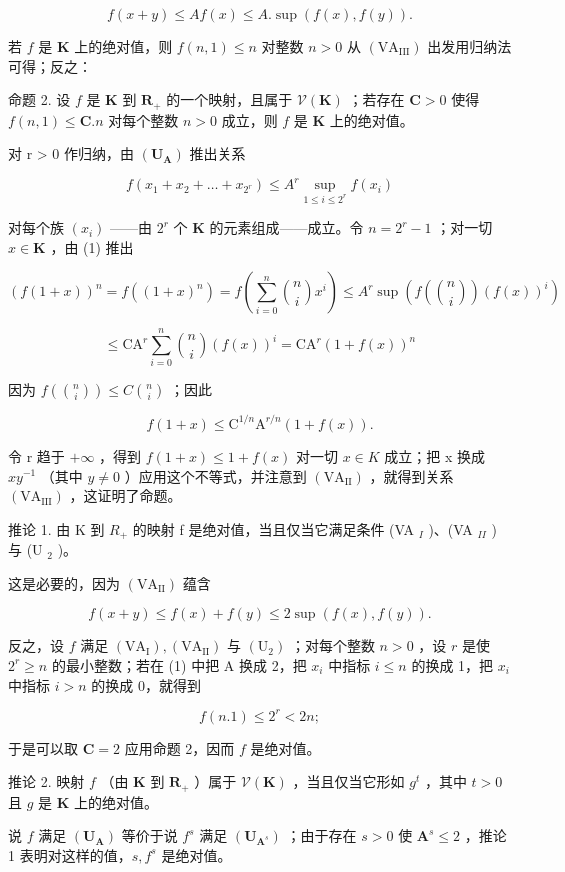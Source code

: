 \[
f (x + y) \leqslant A f (x) \leqslant A. \sup (f (x), f (y)).
\]

若 \(f\) 是 \(\mathbf{K}\) 上的绝对值，则 \(f(n,1) \leqslant n\) 对整数 \(n > 0\) 从 \((\mathrm{VA}_{\mathrm{III}})\) 出发用归纳法可得；反之：

命题 2. 设 \(f\) 是 \(\mathbf{K}\) 到 \(\mathbf{R}_+\) 的一个映射，且属于 \(\mathcal{V}(\mathbf{K})\) ；若存在 \(\mathbf{C} > 0\) 使得 \(f(n,1) \leqslant \mathbf{C}.n\) 对每个整数 \(n > 0\) 成立，则 \(f\) 是 \(\mathbf{K}\) 上的绝对值。

对 r > 0 作归纳，由 \((\mathbf{U}_{\mathbf{A}})\) 推出关系

\[
f (x _ {1} + x _ {2} + \dots + x _ {2 ^ {r}}) \leqslant A ^ {r} \sup _ {1 \leqslant i \leqslant 2 ^ {r}} f (x _ {i})\tag{1}
\]

对每个族 \((x_{i})\) ——由 \(2^{r}\) 个 \(\mathbf{K}\) 的元素组成——成立。令 \(n = 2^{r} - 1\) ；对一切 \(x \in \mathbf{K}\) ，由 (1) 推出

\[
(f (1 + x)) ^ {n} = f ((1 + x) ^ {n}) = f \left(\sum_ {i = 0} ^ {n} \binom {n} {i} x ^ {i}\right) \leqslant A ^ {r} \sup \left(f \left(\binom {n} {i}\right) (f (x)) ^ {i}\right)
\]

\[
\leqslant \mathrm{CA} ^ {r} \sum_ {i = 0} ^ {n} \binom {n} {i} (f (x)) ^ {i} = \mathrm{CA} ^ {r} (1 + f (x)) ^ {n}
\]

因为 \(f\left(\binom{n}{i}\right) \leqslant C\binom{n}{i}\) ；因此

\[
f (1 + x) \leqslant \mathrm{C} ^ {1 / n} \mathrm{A} ^ {r / n} (1 + f (x)).
\]

令 r 趋于 \(+\infty\) ，得到 \(f(1+x)\leqslant1+f(x)\) 对一切 \(x\in K\) 成立；把 x 换成 \(xy^{-1}\) （其中 \(y\neq0\) ）应用这个不等式，并注意到 \((\mathrm{VA}_{\mathrm{II}})\) ，就得到关系 \((\mathrm{VA}_{\mathrm{III}})\) ，这证明了命题。

推论 1. 由 K 到 \(R_{+}\) 的映射 f 是绝对值，当且仅当它满足条件 (VA \(_{I}\) )、(VA \(_{II}\) ) 与 (U \(_{2}\) )。

这是必要的，因为 \((\mathrm{VA}_{\mathrm{II}})\) 蕴含

\[
f (x + y) \leqslant f (x) + f (y) \leqslant 2 \sup (f (x), f (y)).
\]

反之，设 \(f\) 满足 \((\mathrm{VA}_{\mathrm{I}}), (\mathrm{VA}_{\mathrm{II}})\) 与 \((\mathrm{U}_2)\) ；对每个整数 \(n > 0\) ，设 \(r\) 是使 \(2^r \geqslant n\) 的最小整数；若在 (1) 中把 A 换成 2，把 \(x_i\) 中指标 \(i \leqslant n\) 的换成 1，把 \(x_i\) 中指标 \(i > n\) 的换成 0，就得到

\[
f (n. 1) \leqslant 2 ^ {r} <   2 n;
\]

于是可以取 \(\mathbf{C} = 2\) 应用命题 2，因而 \(f\) 是绝对值。

推论 2. 映射 \(f\) （由 \(\mathbf{K}\) 到 \(\mathbf{R}_+\) ）属于 \(\mathcal{V}(\mathbf{K})\) ，当且仅当它形如 \(g^t\) ，其中 \(t > 0\) 且 \(g\) 是 \(\mathbf{K}\) 上的绝对值。

说 \(f\) 满足 \((\mathbf{U}_{\mathbf{A}})\) 等价于说 \(f^s\) 满足 \((\mathbf{U}_{\mathbf{A}^s})\) ；由于存在 \(s > 0\) 使 \(\mathbf{A}^s \leqslant 2\) ，推论 1 表明对这样的值，\(s, f^s\) 是绝对值。

